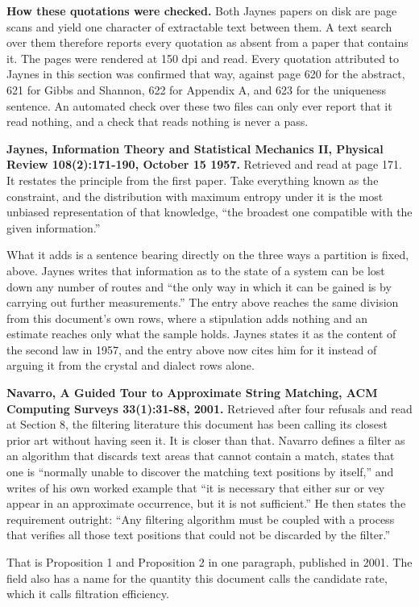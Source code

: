 \textbf{How these quotations were checked.} Both Jaynes papers on disk are page scans and yield one character of extractable text between them. A text search over them therefore reports every quotation as absent from a paper that contains it. The pages were rendered at 150 dpi and read. Every quotation attributed to Jaynes in this section was confirmed that way, against page 620 for the abstract, 621 for Gibbs and Shannon, 622 for Appendix A, and 623 for the uniqueness sentence. An automated check over these two files can only ever report that it read nothing, and a check that reads nothing is never a pass.

\textbf{Jaynes, Information Theory and Statistical Mechanics II, Physical Review 108(2):171-190, October 15 1957.} Retrieved and read at page 171. It restates the principle from the first paper. Take everything known as the constraint, and the distribution with maximum entropy under it is the most unbiased representation of that knowledge, ``the broadest one compatible with the given information.''

What it adds is a sentence bearing directly on the three ways a partition is fixed, above. Jaynes writes that information as to the state of a system can be lost down any number of routes and ``the only way in which it can be gained is by carrying out further measurements.'' The entry above reaches the same division from this document's own rows, where a stipulation adds nothing and an estimate reaches only what the sample holds. Jaynes states it as the content of the second law in 1957, and the entry above now cites him for it instead of arguing it from the crystal and dialect rows alone.

\textbf{Navarro, A Guided Tour to Approximate String Matching, ACM Computing Surveys 33(1):31-88, 2001.} Retrieved after four refusals and read at Section 8, the filtering literature this document has been calling its closest prior art without having seen it. It is closer than that. Navarro defines a filter as an algorithm that discards text areas that cannot contain a match, states that one is ``normally unable to discover the matching text positions by itself,'' and writes of his own worked example that ``it is necessary that either sur or vey appear in an approximate occurrence, but it is not sufficient.'' He then states the requirement outright: ``Any filtering algorithm must be coupled with a process that verifies all those text positions that could not be discarded by the filter.''

That is Proposition 1 and Proposition 2 in one paragraph, published in 2001. The field also has a name for the quantity this document calls the candidate rate, which it calls filtration efficiency.

